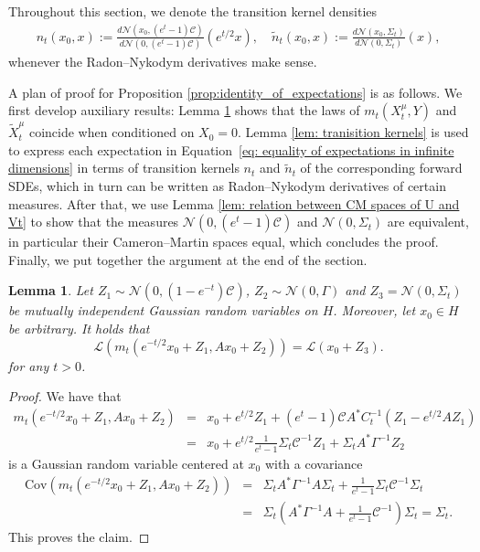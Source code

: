 \documentclass[10pt]{article} %
\def\Eqref#1{Equation~\ref{#1}}
\theoremstyle{plain}
\newtheorem{lemma}[theorem]{Lemma}
\theoremstyle{definition}
\theoremstyle{remark}
\renewcommand{\L}{\mathscr{L}}
\newcommand{\C}{\mathcal C}
\newcommand{\N}{\mathcal N}
\begin{document}
Throughout this section, we denote the transition kernel densities
\begin{eqnarray*}
        n_t(x_0, x) := \frac{d \N( x_0, (e^t-1) \C)}{d \N(0, (e^t-1) \C)}(e^{t/2}x), \quad 
        \tilde n_t(x_0, x) := \frac{d \N(x_0, \Sigma_t)}{d \N(0, \Sigma_t)}(x),
    \end{eqnarray*}
whenever the Radon--Nykodym derivatives make sense.

A plan of proof for Proposition \ref{prop:identity_of_expectations} is as follows. We first develop auxiliary results: Lemma \ref{lem: training loss} shows that the laws of $m_t(X^\mu_t, Y)$ and $\widetilde{X}^\mu_t$ coincide when conditioned on $X_0=0$. Lemma \ref{lem: tranisition kernels} is used to express each expectation in \Eqref{eq: equality of expectations in infinite dimensions} in terms of transition kernels $n_t$ and $\tilde n_t$ of the corresponding forward SDEs, which in turn can be written as Radon--Nykodym derivatives of certain measures. After that, we use Lemma \ref{lem: relation between CM spaces of U and Vt} to show that the measures $\N(0, (e^t-1)\C)$ and $\N(0, \Sigma_t)$ are equivalent, in particular their Cameron--Martin spaces equal, which concludes the proof.
Finally, we put together the argument at the end of the section.

\begin{lemma}\label{lem: training loss}
Let $Z_1 \sim \N(0, (1-e^{-t})\C)$, $Z_2 \sim \N(0,\Gamma)$ and $Z_3 = \N(0,\Sigma_t)$ be mutually independent Gaussian random variables on $H$.
Moreover, let $x_0 \in H$ be arbitrary. It holds that
\begin{equation*}
	\L(m_t(e^{-t/2}x_0 + Z_1, Ax_0 + Z_2)) = \L(x_0 + Z_3).
\end{equation*}
for any $t>0$.
\end{lemma}
\begin{proof}
	We have that
    \begin{eqnarray*}
         m_t(e^{-t/2}x_0 + Z_1, Ax_0 + Z_2) & = & x_0 + e^{t/2}Z_1 + (e^t-1) \C A^* C_t^{-1}(Z_1 - e^{t/2}A Z_1) \\
         & = & x_0 + e^{t/2} \frac{1}{e^t-1}\Sigma_t \C^{-1} Z_1 + \Sigma_t A^* \Gamma^{-1} Z_2
    \end{eqnarray*}
    is a Gaussian random variable centered at $x_0$ with a covariance
    \begin{eqnarray*}
        \text{Cov}(m_t(e^{-t/2}x_0 + Z_1, Ax_0 + Z_2)) &=& \Sigma_t A^* \Gamma^{-1} A \Sigma_t + \frac{1}{e^t-1} \Sigma_t \C^{-1} \Sigma_t \\
        & = & \Sigma_t \left( A^* \Gamma^{-1}A + \frac{1}{e^t-1} \C^{-1}\right) \Sigma_t = \Sigma_t.
    \end{eqnarray*}
    This proves the claim.
\end{proof}
\end{document}
